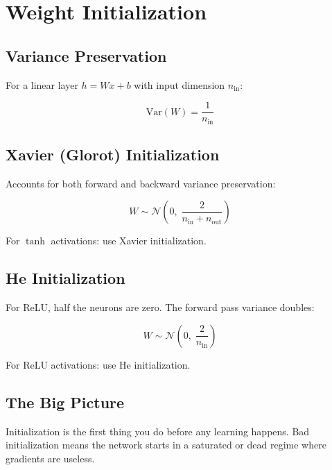 \documentclass[11pt,a4paper]{book}
\begin{document}
\chapter{Weight Initialization}\label{ch:initialization}

\section{Variance Preservation}

For a linear layer $h = Wx + b$ with input dimension $n_{\text{in}}$:

\begin{equation}
    \text{Var}(W) = \frac{1}{n_{\text{in}}}
\end{equation}

\section{Xavier (Glorot) Initialization}

Accounts for both forward and backward variance preservation:

\begin{equation}
    W \sim \mathcal{N}\!\left(0,\; \frac{2}{n_{\text{in}} + n_{\text{out}}}\right)
\end{equation}

\begin{boxnote}{}
For $\tanh$ activations: use Xavier initialization.
\end{boxnote}

\section{He Initialization}

For ReLU, half the neurons are zero. The forward pass variance doubles:

\begin{equation}
    W \sim \mathcal{N}\!\left(0,\; \frac{2}{n_{\text{in}}}\right)
\end{equation}

\begin{boxnote}{}
For ReLU activations: use He initialization.
\end{boxnote}

\section{The Big Picture}

\begin{boxkey}{}
Initialization is the first thing you do before any learning happens. Bad initialization means the network starts in a saturated or dead regime where gradients are useless.
\end{boxkey}
\end{document}
